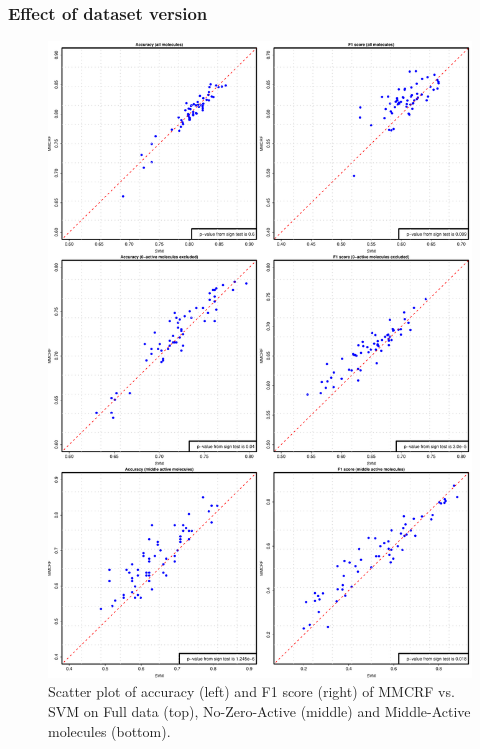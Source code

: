 \documentclass[english]{tktltiki}
\begin{document}
\subsubsection{Effect of dataset version}

\begin{figure}[p]
\includegraphics[width=1\columnwidth]{./plots/acc-f1-combined.pdf}
\caption[performance of MMCRF against SVM in cell lines.]{Scatter plot of accuracy (left) and F1 score (right) of MMCRF vs. SVM on Full data (top), No-Zero-Active  (middle) and Middle-Active molecules (bottom).}
\label{cellline_scatter_plot}
\end{figure}
\end{document}
